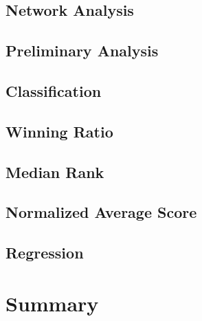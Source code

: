 \subsection{Network Analysis}

\subsection{Preliminary Analysis}

\subsection{Classification}

\subsection{Winning Ratio}

\subsection{Median Rank}

\subsection{Normalized Average Score}

\subsection{Regression}

\section{Summary}
